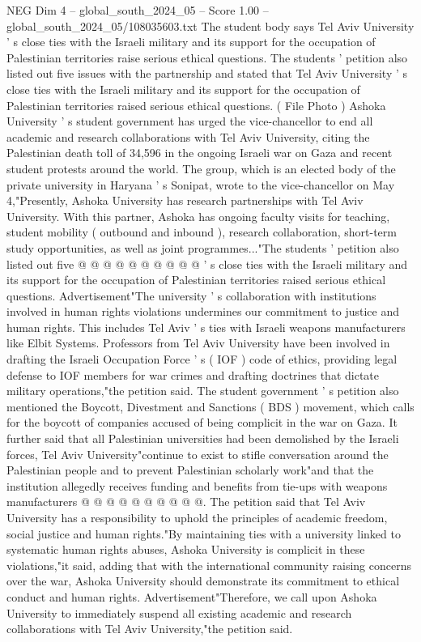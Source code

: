 \begin{textsample}{NEG Dim 4 – global\_south\_2024\_05 – Score 1.00 – global\_south\_2024\_05/108035603.txt}  \label{ex:f4_neg_252}
The student body says Tel Aviv University ' s close ties with the Israeli military and its support for the occupation of Palestinian territories raise serious ethical questions.
The students ' petition also listed out five issues with the partnership and stated that Tel Aviv University ' s close ties with the Israeli military and its support for the occupation of Palestinian territories raised serious ethical questions. ( File Photo ) Ashoka University ' s student government has urged the vice-chancellor to end all academic and research collaborations with Tel Aviv University, citing the Palestinian death toll of 34,596 in the ongoing Israeli war on Gaza and recent student protests around the world.
The group, which is an elected body of the private university in Haryana ' s Sonipat, wrote to the vice-chancellor on May 4,"Presently, Ashoka University has research partnerships with Tel Aviv University.
With this partner, Ashoka has ongoing faculty visits for teaching, student mobility ( outbound and inbound ), research collaboration, short-term study opportunities, as well as joint programmes..."The students ' petition also listed out five @ @ @ @ @ @ @ @ @ @ ' s close ties with the Israeli military and its support for the occupation of Palestinian territories raised serious ethical questions.
Advertisement"The university ' s collaboration with institutions involved in human rights violations undermines our commitment to justice and human rights.
This includes Tel Aviv ' s ties with Israeli weapons manufacturers like Elbit Systems.
Professors from Tel Aviv University have been involved in drafting the Israeli Occupation Force ' s ( IOF ) code of ethics, providing legal defense to IOF members for war crimes and drafting doctrines that dictate military operations,"the petition said.
The student government ' s petition also mentioned the Boycott, Divestment and Sanctions ( BDS ) movement, which calls for the boycott of companies accused of being complicit in the war on Gaza.
It further said that all Palestinian universities had been demolished by the Israeli forces, Tel Aviv University"continue to exist to stifle conversation around the Palestinian people and to prevent Palestinian scholarly work"and that the institution allegedly receives funding and benefits from tie-ups with weapons manufacturers @ @ @ @ @ @ @ @ @ @.
The petition said that Tel Aviv University has a responsibility to uphold the principles of academic freedom, social justice and human rights."By maintaining ties with a university linked to systematic human rights abuses, Ashoka University is complicit in these violations,"it said, adding that with the international community raising concerns over the war, Ashoka University should demonstrate its commitment to ethical conduct and human rights.
Advertisement"Therefore, we call upon Ashoka University to immediately suspend all existing academic and research collaborations with Tel Aviv University,"the petition said.

\end{textsample}
